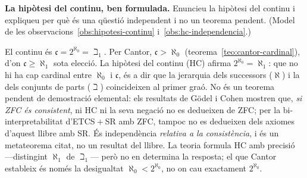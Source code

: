 \begin{exercici}
\textbf{La hipòtesi del continu, ben formulada.} Enuncieu la hipòtesi del continu i expliqueu per què és una qüestió independent i no un teorema pendent. (Model de les observacions~\ref{obs:hipotesi-continu} i~\ref{obs:hc-independencia}.)
\end{exercici}
\begin{solucio}
El continu és \(\mathfrak c=2^{\aleph_0}=\beth_1\). Per Cantor, \(\mathfrak c>\aleph_0\) (teorema~\ref{teo:cantor-cardinal}), d'on \(\mathfrak c\ge\aleph_1\) sota elecció. La hipòtesi del continu (HC) afirma \(2^{\aleph_0}=\aleph_1\): que no hi ha cap cardinal entre \(\aleph_0\) i \(\mathfrak c\), és a dir que la jerarquia dels successors (\(\aleph\)) i la dels conjunts de parts (\(\beth\)) coincideixen al primer graó. No és un teorema pendent de demostració elemental: els resultats de Gödel i Cohen mostren que, \emph{si ZFC és consistent}, ni HC ni la seva negació no es dedueixen de ZFC; per la bi-interpretabilitat d'ETCS\({}+{}\)SR amb ZFC, tampoc no es dedueixen dels axiomes d'aquest llibre amb SR. És independència \emph{relativa a la consistència}, i és un metateorema citat, no un resultat del llibre. La teoria formula HC amb precisió ---distingint \(\aleph_1\) de \(\beth_1\)--- però no en determina la resposta; el que Cantor estableix és només la desigualtat \(\aleph_0<2^{\aleph_0}\), no on cau exactament \(2^{\aleph_0}\).
\end{solucio}
